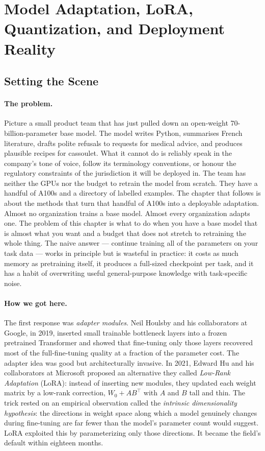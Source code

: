 \section{Model Adaptation, LoRA, Quantization, and Deployment Reality}

\subsection*{Setting the Scene}

\paragraph{The problem.}
Picture a small product team that has just pulled down an
open-weight 70-billion-parameter base model. The model writes
Python, summarises French literature, drafts polite refusals to
requests for medical advice, and produces plausible recipes for
cassoulet. What it cannot do is reliably speak in the company's
tone of voice, follow its terminology conventions, or honour the
regulatory constraints of the jurisdiction it will be deployed in.
The team has neither the GPUs nor the budget to retrain the model
from scratch. They have a handful of A100s and a directory of
labelled examples. The chapter that follows is about the methods
that turn that handful of A100s into a deployable adaptation.
Almost no organization trains a base model. Almost every
organization adapts one. The problem of this
chapter is what to do when you have a base model that is almost what
you want and a budget that does not stretch to retraining the whole
thing. The naive answer --- continue training all of the parameters
on your task data --- works in principle but is wasteful in
practice: it costs as much memory as pretraining itself, it produces
a full-sized checkpoint per task, and it has a habit of overwriting
useful general-purpose knowledge with task-specific noise.

\paragraph{How we got here.}
The first response was \emph{adapter modules}. Neil Houlsby and his
collaborators at Google, in 2019, inserted small trainable
bottleneck layers into a frozen pretrained Transformer and showed
that fine-tuning only those layers recovered most of the
full-fine-tuning quality at a fraction of the parameter cost. The
adapter idea was good but architecturally invasive. In 2021, Edward
Hu and his collaborators at Microsoft proposed an alternative they
called \emph{Low-Rank Adaptation} (LoRA): instead of inserting new
modules, they updated each weight matrix by a low-rank correction,
$W_0 + AB^\top$ with $A$ and $B$ tall and thin. The trick rested on
an empirical observation called the \emph{intrinsic dimensionality
hypothesis}: the directions in weight space along which a model
genuinely changes during fine-tuning are far fewer than the model's
parameter count would suggest. LoRA exploited this by parameterizing
only those directions. It became the field's default within
eighteen months.

